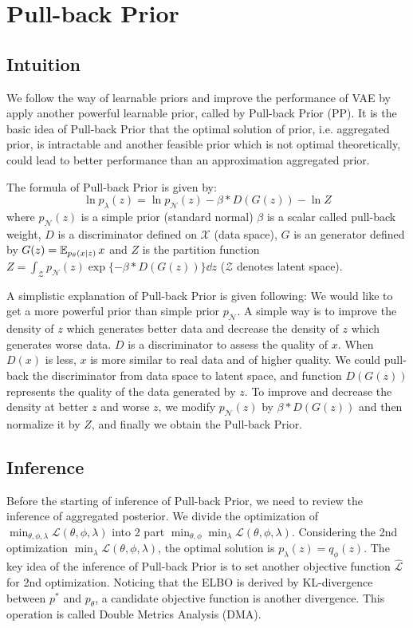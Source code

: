 \section{Pull-back Prior}\label{sec:pull_back_prior}

\subsection{Intuition}
We follow the way of learnable priors and improve the performance of VAE by apply another powerful learnable prior, called by Pull-back Prior (PP). It is the basic idea of Pull-back Prior that the optimal solution of prior, i.e. aggregated prior, is intractable and another feasible prior which is not optimal theoretically, could lead to better performance than an approximation aggregated prior.

The formula of Pull-back Prior is given by:
\begin{equation}\label{eq:pull_back_prior}
	\ln p_\lambda(z) = \ln p_\mathcal{N}(z) - \beta * D(G(z)) - \ln Z \tag{4}
\end{equation}
where $p_\mathcal{N}(z)$ is a simple prior (\EG standard normal) $\beta$ is a scalar called pull-back weight, $D$ is a discriminator defined on $\mathcal{X}$ (data space), $G$ is an generator defined by $G(z) = \operatorname{\mathbb{E}}_{p_\theta(x|z)} x$ and $Z$ is the partition function $Z = \int_{\mathcal{Z}} p_\mathcal{N}(z) \exp\{- \beta * D(G(z))\} \dd z$ ($\mathcal{Z}$ denotes latent space).

A simplistic explanation of Pull-back Prior is given following: We would like to get a more powerful prior than simple prior $p_\mathcal{N}$. A simple way is to improve the density of $z$ which generates better data and decrease the density of $z$ which generates worse data. $D$ is a discriminator to assess the quality of $x$. When $D(x)$ is less, $x$ is more similar to real data and of higher quality. We could pull-back the discriminator from data space to latent space, and function $D(G(z))$ represents the quality of the data generated by $z$. To improve and decrease the density at better $z$ and worse $z$, we modify $p_\mathcal{N}(z)$ by $\beta * D(G(z))$ and then normalize it by $Z$, and finally we obtain the Pull-back Prior. 

\subsection{Inference}

Before the starting of inference of Pull-back Prior, we need to review the inference of aggregated posterior. We divide the optimization of $\min_{\theta, \phi, \lambda} \mathcal{L}(\theta, \phi, \lambda)$ into 2 part $\min_{\theta, \phi} \min_{\lambda} \mathcal{L}(\theta, \phi, \lambda)$. Considering the 2nd optimization $\min_\lambda \mathcal{L}(\theta, \phi, \lambda)$, the optimal solution is $p_\lambda(z) = q_\phi(z)$. The key idea of the inference of Pull-back Prior is to set another objective function $\hat{\mathcal{L}}$ for 2nd optimization. Noticing that the ELBO is derived by KL-divergence between $p^*$ and $p_\theta$, a candidate objective function is another divergence. This operation is called Double Metrics Analysis (DMA). 

